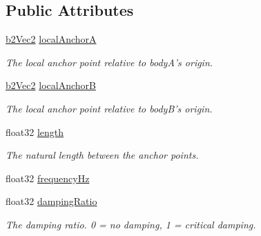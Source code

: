 \subsection*{Public Attributes}
\begin{DoxyCompactItemize}
\item 
\hypertarget{structb2_distance_joint_def_a15c7a75fa277e2056bf1b44198658518}{\hyperlink{structb2_vec2}{b2\-Vec2} \hyperlink{structb2_distance_joint_def_a15c7a75fa277e2056bf1b44198658518}{local\-Anchor\-A}}\label{structb2_distance_joint_def_a15c7a75fa277e2056bf1b44198658518}

\begin{DoxyCompactList}\small\item\em The local anchor point relative to body\-A's origin. \end{DoxyCompactList}\item 
\hypertarget{structb2_distance_joint_def_a3c8995be726238eee084af750442255c}{\hyperlink{structb2_vec2}{b2\-Vec2} \hyperlink{structb2_distance_joint_def_a3c8995be726238eee084af750442255c}{local\-Anchor\-B}}\label{structb2_distance_joint_def_a3c8995be726238eee084af750442255c}

\begin{DoxyCompactList}\small\item\em The local anchor point relative to body\-B's origin. \end{DoxyCompactList}\item 
\hypertarget{structb2_distance_joint_def_ac2c48ad52de91c804c386c12c5bf3714}{float32 \hyperlink{structb2_distance_joint_def_ac2c48ad52de91c804c386c12c5bf3714}{length}}\label{structb2_distance_joint_def_ac2c48ad52de91c804c386c12c5bf3714}

\begin{DoxyCompactList}\small\item\em The natural length between the anchor points. \end{DoxyCompactList}\item 
float32 \hyperlink{structb2_distance_joint_def_a35e2362bcb6c58734f95d0ac045863ea}{frequency\-Hz}
\item 
\hypertarget{structb2_distance_joint_def_ad009b24ff211158eb4e1db4815a63b94}{float32 \hyperlink{structb2_distance_joint_def_ad009b24ff211158eb4e1db4815a63b94}{damping\-Ratio}}\label{structb2_distance_joint_def_ad009b24ff211158eb4e1db4815a63b94}

\begin{DoxyCompactList}\small\item\em The damping ratio. 0 = no damping, 1 = critical damping. \end{DoxyCompactList}\end{DoxyCompactItemize}


